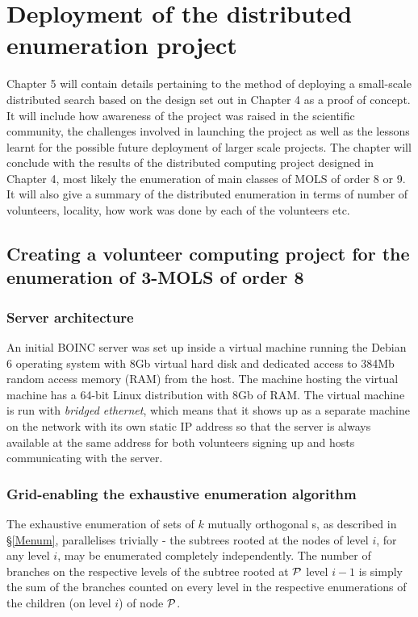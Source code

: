 \chapter{Deployment of the distributed enumeration project}
\vspace{-2em}
\minitoc

Chapter 5 will contain details pertaining to the method of deploying a small-scale distributed search based on the design set out in Chapter 4 as a proof of concept.  It will include how awareness of the project was raised in the scientific community, the  challenges involved in launching the project as well as the lessons learnt for the possible future deployment of larger scale projects.  The chapter will conclude with the results of the distributed computing project designed in Chapter 4, most likely the enumeration of main classes of MOLS of order 8 or 9.  It will also give a summary of the distributed enumeration in terms of number of volunteers, locality, how work was done by each of the volunteers etc. 

\section{Creating a volunteer computing project for the enumeration of 3-MOLS of order 8}
\subsection{Server architecture} \label{5server}
An initial BOINC server was set up inside a virtual machine running the Debian 6 operating system with 8Gb virtual hard disk and dedicated access to 384Mb random access memory (RAM) from the host. The machine hosting the virtual machine has a 64-bit Linux distribution with 8Gb of RAM. 
The virtual machine is run with \emph{bridged ethernet}, which means that it shows up as a separate machine on the network with its own static IP address so that the server is always available at the same address for both volunteers signing up and hosts communicating with the server.
\subsection{Grid-enabling the exhaustive enumeration algorithm} \label{5grid}
The exhaustive enumeration of sets of $k$ mutually orthogonal \lat s, as described in \S\ref{Menum}, parallelises trivially - the subtrees rooted at  the nodes of level $i$, for any level $i$, may be enumerated completely independently. The   number of branches on the respective levels of the subtree  rooted at $\mathcal{P}$ level $i-1$ is simply the sum of the branches counted on every level in the respective enumerations of the children (on level $i$) of node $\mathcal{P}$.


